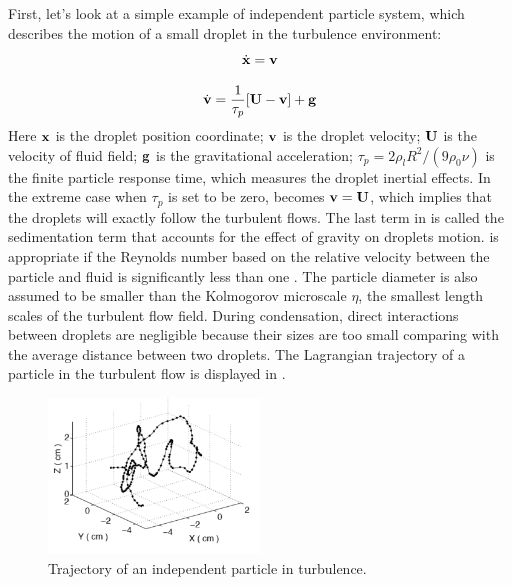 First, let's look at a simple example of independent particle system, which describes the motion of a small droplet in the turbulence environment:
\begin{equation}
\dot{\mathbf{x}}=\mathbf{v}\label{droplet_x_eqn}
\end{equation}

\begin{equation}
\dot{\mathbf{v}}=\frac{1}{\tau_{p}}[\mathbf{U}-\mathbf{v}]+\mathbf{g}\label{droplet_v_eqn}
\end{equation}
Here $\mathbf{x}$ is the droplet position coordinate; 
$\mathbf{v}$ is the droplet velocity; $\mathbf{U}$ is the velocity of fluid field;
$\mathbf{g}$ is the gravitational acceleration; $\tau_{p}=2\rho_{l}R^{2}/(9\rho_{0}\nu)$ is the finite particle response time, which measures the droplet inertial
effects. In the extreme case when $\tau_{p}$ is set to be zero, 
becomes $\mathbf{v}=\mathbf{U}$, which implies that the
droplets will exactly follow the turbulent flows. The last term in  is called the sedimentation term that accounts for the effect of
gravity on droplets motion.  is appropriate if the
Reynolds number based on the relative velocity between the particle and fluid
is significantly less than one \cite{Eaton1994}. The particle diameter is also
assumed to be smaller than the Kolmogorov microscale $\eta$, the smallest
length scales of the turbulent flow field. During condensation, direct
interactions between droplets are negligible because their sizes are too small
comparing with the average distance between two droplets. The Lagrangian trajectory of a particle in the turbulent flow is displayed in .
\begin{figure}
\centering
\includegraphics[width=0.5\textwidth]{Figures/Lagrangian_trajectory.png}
\caption{Trajectory of an independent particle in turbulence.}
\label{fig:lag_traj}
\end{figure}


